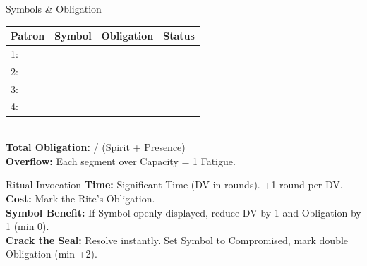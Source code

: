 \documentclass[10pt]{article}
\begin{document}
\begin{minipage}[t]{0.48\linewidth}
    \vspace{0.5em}
    
    \begin{charbox}{Symbols \& Obligation}
        \begin{tabular}{|p{2cm}|p{2cm}|p{2cm}|p{2cm}|}
            \hline
            \textbf{Patron} & \textbf{Symbol} & \textbf{Obligation} & \textbf{Status} \\
            \hline
            1: & \underline{\hspace{1.5cm}} & \underline{\hspace{1cm}} & \underline{\hspace{1.5cm}} \\
            \hline
            2: & \underline{\hspace{1.5cm}} & \underline{\hspace{1cm}} & \underline{\hspace{1.5cm}} \\
            \hline
            3: & \underline{\hspace{1.5cm}} & \underline{\hspace{1cm}} & \underline{\hspace{1.5cm}} \\
            \hline
            4: & \underline{\hspace{1.5cm}} & \underline{\hspace{1cm}} & \underline{\hspace{1.5cm}} \\
            \hline
        \end{tabular}\\
        \textbf{Total Obligation:} \underline{\hspace{1cm}} / \underline{\hspace{1.5cm}} (Spirit + Presence)\\
        \textbf{Overflow:} Each segment over Capacity = 1 Fatigue.
    \end{charbox}
    
    \vspace{0.5em}
    
    \begin{charbox}{Ritual Invocation}
        \textbf{Time:} Significant Time (DV in rounds). +1 round per DV.\\
        \textbf{Cost:} Mark the Rite's Obligation.\\
        \textbf{Symbol Benefit:} If Symbol openly displayed, reduce DV by 1 and Obligation by 1 (min 0).\\
        \textbf{Crack the Seal:} Resolve instantly. Set Symbol to Compromised, mark double Obligation (min +2).
    \end{charbox}
\end{minipage}
\end{document}
